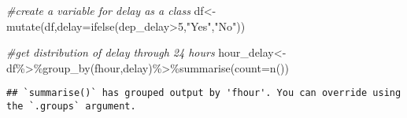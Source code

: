 \documentclass[
]{article}
\newenvironment{Shaded}{\begin{snugshade}}{\end{snugshade}}
\newcommand{\AttributeTok}[1]{\textcolor[rgb]{0.77,0.63,0.00}{#1}}
\newcommand{\CommentTok}[1]{\textcolor[rgb]{0.56,0.35,0.01}{\textit{#1}}}
\newcommand{\DecValTok}[1]{\textcolor[rgb]{0.00,0.00,0.81}{#1}}
\newcommand{\FunctionTok}[1]{\textcolor[rgb]{0.00,0.00,0.00}{#1}}
\newcommand{\NormalTok}[1]{#1}
\newcommand{\OtherTok}[1]{\textcolor[rgb]{0.56,0.35,0.01}{#1}}
\newcommand{\SpecialCharTok}[1]{\textcolor[rgb]{0.00,0.00,0.00}{#1}}
\newcommand{\StringTok}[1]{\textcolor[rgb]{0.31,0.60,0.02}{#1}}
\begin{document}
\begin{Shaded}
\begin{Highlighting}[]
\CommentTok{\#create a variable for delay as a class  }
\NormalTok{df}\OtherTok{\textless{}{-}}\FunctionTok{mutate}\NormalTok{(df,}\AttributeTok{delay=}\FunctionTok{ifelse}\NormalTok{(dep\_delay}\SpecialCharTok{\textgreater{}}\DecValTok{5}\NormalTok{,}\StringTok{"Yes"}\NormalTok{,}\StringTok{"No"}\NormalTok{))}

\CommentTok{\#get distribution of delay through 24 hours}
\NormalTok{hour\_delay}\OtherTok{\textless{}{-}}\NormalTok{df}\SpecialCharTok{\%\textgreater{}\%}\FunctionTok{group\_by}\NormalTok{(fhour,delay)}\SpecialCharTok{\%\textgreater{}\%}\FunctionTok{summarise}\NormalTok{(}\AttributeTok{count=}\FunctionTok{n}\NormalTok{())}
\end{Highlighting}
\end{Shaded}

\begin{verbatim}
## `summarise()` has grouped output by 'fhour'. You can override using the `.groups` argument.
\end{verbatim}
\end{document}
